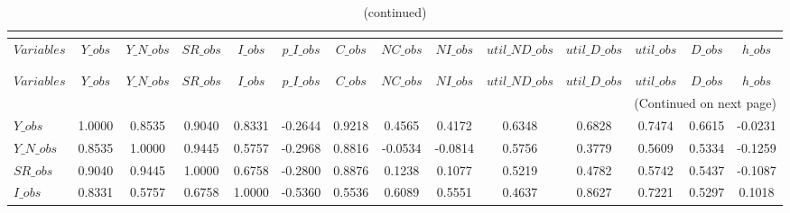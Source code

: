  
\begin{center}
\begin{longtable}{lccccccccccccc} 
\caption{MATRIX OF CORRELATIONS}\\
 \label{Table:th_corr_matrix}\\
\toprule 
$Variables      $	 & 	 $          Y\_obs$	 & 	 $      Y\_N\_obs$	 & 	 $         SR\_obs$	 & 	 $          I\_obs$	 & 	 $      p\_I\_obs$	 & 	 $          C\_obs$	 & 	 $         NC\_obs$	 & 	 $         NI\_obs$	 & 	 $  util\_ND\_obs$	 & 	 $   util\_D\_obs$	 & 	 $       util\_obs$	 & 	 $          D\_obs$	 & 	 $          h\_obs$\\
\midrule \endfirsthead 
\caption{(continued)}\\
 \toprule \\ 
$Variables      $	 & 	 $          Y\_obs$	 & 	 $      Y\_N\_obs$	 & 	 $         SR\_obs$	 & 	 $          I\_obs$	 & 	 $      p\_I\_obs$	 & 	 $          C\_obs$	 & 	 $         NC\_obs$	 & 	 $         NI\_obs$	 & 	 $  util\_ND\_obs$	 & 	 $   util\_D\_obs$	 & 	 $       util\_obs$	 & 	 $          D\_obs$	 & 	 $          h\_obs$\\
\midrule \endhead 
\midrule \multicolumn{14}{r}{(Continued on next page)} \\ \bottomrule \endfoot 
\bottomrule \endlastfoot 
$Y\_obs         $	 & 	           1.0000	 & 	           0.8535	 & 	           0.9040	 & 	           0.8331	 & 	          -0.2644	 & 	           0.9218	 & 	           0.4565	 & 	           0.4172	 & 	           0.6348	 & 	           0.6828	 & 	           0.7474	 & 	           0.6615	 & 	          -0.0231 \\ 
$Y\_N\_obs      $	 & 	           0.8535	 & 	           1.0000	 & 	           0.9445	 & 	           0.5757	 & 	          -0.2968	 & 	           0.8816	 & 	          -0.0534	 & 	          -0.0814	 & 	           0.5756	 & 	           0.3779	 & 	           0.5609	 & 	           0.5334	 & 	          -0.1259 \\ 
$SR\_obs        $	 & 	           0.9040	 & 	           0.9445	 & 	           1.0000	 & 	           0.6758	 & 	          -0.2800	 & 	           0.8876	 & 	           0.1238	 & 	           0.1077	 & 	           0.5219	 & 	           0.4782	 & 	           0.5742	 & 	           0.5437	 & 	          -0.1087 \\ 
$I\_obs         $	 & 	           0.8331	 & 	           0.5757	 & 	           0.6758	 & 	           1.0000	 & 	          -0.5360	 & 	           0.5536	 & 	           0.6089	 & 	           0.5551	 & 	           0.4637	 & 	           0.8627	 & 	           0.7221	 & 	           0.5297	 & 	           0.1018 \\ 

\end{longtable}
\end{center}
